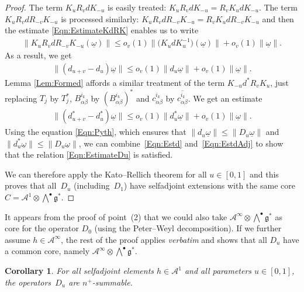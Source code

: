 \documentclass[11pt]{article}
\newtheorem{Corollary}[Theorem]{Corollary}
\newcommand{\Aa}{\mathcal{A}}
\newcommand{\Core}{C}
\newcommand{\LieG}{\mathfrak{g}}
\newcommand{\omegat}{\underline{\omega}}
\numberwithin{equation}{section}
\begin{document}
\begin{proof}
The term $K_u R_v d K_{-u}$ is easily treated: $K_u R_v d K_{-u} = R_v K_u d K_{-u}$. The term $K_u R_v d R_{-v} K_{-u}$ is processed similarly: $ K_u R_v d R_{-v} K_{-u} = R_v K_u d R_{-v} K_{-u}$ and then the estimate \eqref{Eqn:EstimateKdRK} enables us to write
\begin{gather*}
\| K_u R_v d R_{-v} K_{-u}(\omegat) \| \leqslant o_v(1) \big\| \big(K_u d K_u^{-1}\big)(\omegat) \big\| + o_v(1) \| \omegat \|.
\end{gather*}
As a result, we get
\begin{gather}
\label{Eqn:Estd}
\| (d_{u+v} - d_u) \omegat \| \leqslant o_v(1) \| d_u \omegat \| + o_v(1) \| \omegat \|.
\end{gather}
Lemma \ref{Lem:Formed} af\/fords a similar treatment of the term $K_{-u} d^* R_v K_u $, just replacing $T_j$ by $T^*_j$, $B^{i_k}_{\alpha \beta}$ by $(B^{i_k}_{\alpha \beta})^*$ and $c^{i_k}_{\alpha \beta}$ by $\overline{c^{i_k}_{\alpha \beta}}$. We get an estimate
\begin{gather}
\label{Eqn:EstdAdj}
\| (d_{u+v}^* - d_u^*) \omegat \| \leqslant o_v(1) \| d_u^* \omegat \| + o_v(1) \| \omegat \|.
\end{gather}
Using the equation \eqref{Eqn:Pyth}, which ensures that $\| d_u \omegat \| \leqslant \| D_u \omegat \|$ and $\| d_u^* \omegat \| \leqslant \| D_u \omegat \|$, we can combine~\eqref{Eqn:Estd} and~\eqref{Eqn:EstdAdj} to show that the relation \eqref{Eqn:EstimateDu} is satisf\/ied.

We can therefore apply the Kato--Rellich theorem for all $u \in [0,1]$ and this proves that all~$D_u$ (including~$D_1$) have selfadjoint extensions with the same core $\Core = \Aa^1 \otimes \bigwedge^\bullet \LieG^*$.
\end{proof}

\begin{Remark}
\label{Rk:Domain}
It appears from the proof of point~(2) %
that we could also take $\Aa^\infty \otimes \bigwedge^\bullet \LieG^*$ as core for the operator $D_0$ (using the Peter--Weyl decomposition). If we further assume $h \in \Aa^\infty $, the rest of the proof applies \textit{verbatim} and shows that all $D_u$ have a common core, namely $\Aa^\infty \otimes \bigwedge^\bullet \LieG^*$.
\end{Remark}

\begin{Corollary}
\label{Cor:FiniteSumma}
For all selfadjoint elements $h \in \Aa^1$ and all parameters $u \in [0,1]$, the opera\-tors~$D_u$ are $n^+$-summable.
\end{Corollary}
\end{document}
